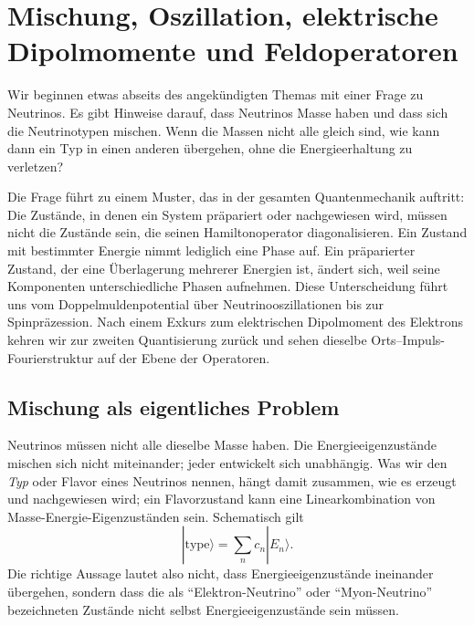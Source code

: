 \chapter{Mischung, Oszillation, elektrische Dipolmomente und Feldoperatoren}

Wir beginnen etwas abseits des angekündigten Themas mit einer Frage zu Neutrinos. Es gibt Hinweise darauf, dass Neutrinos Masse haben und dass sich die Neutrinotypen mischen. Wenn die Massen nicht alle gleich sind, wie kann dann ein Typ in einen anderen übergehen, ohne die Energieerhaltung zu verletzen?

Die Frage führt zu einem Muster, das in der gesamten Quantenmechanik auftritt: Die Zustände, in denen ein System präpariert oder nachgewiesen wird, müssen nicht die Zustände sein, die seinen Hamiltonoperator diagonalisieren. Ein Zustand mit bestimmter Energie nimmt lediglich eine Phase auf. Ein präparierter Zustand, der eine Überlagerung mehrerer Energien ist, ändert sich, weil seine Komponenten unterschiedliche Phasen aufnehmen. Diese Unterscheidung führt uns vom Doppelmuldenpotential über Neutrinooszillationen bis zur Spinpräzession. Nach einem Exkurs zum elektrischen Dipolmoment des Elektrons kehren wir zur zweiten Quantisierung zurück und sehen dieselbe Orts--Impuls-Fourierstruktur auf der Ebene der Operatoren.

\section{Mischung als eigentliches Problem}

Neutrinos müssen nicht alle dieselbe Masse haben. Die Energieeigenzustände mischen sich nicht miteinander; jeder entwickelt sich unabhängig. Was wir den \emph{Typ} oder Flavor eines Neutrinos nennen, hängt damit zusammen, wie es erzeugt und nachgewiesen wird; ein Flavorzustand kann eine Linearkombination von Masse-Energie-Eigenzuständen sein. Schematisch gilt
\begin{equation}
|\text{type}\rangle = \sum_n c_n |E_n\rangle .
\end{equation}
Die richtige Aussage lautet also nicht, dass Energieeigenzustände ineinander übergehen, sondern dass die als ``Elektron-Neutrino'' oder ``Myon-Neutrino'' bezeichneten Zustände nicht selbst Energieeigenzustände sein müssen.

\begin{classroomqa}
\end{classroomqa}

